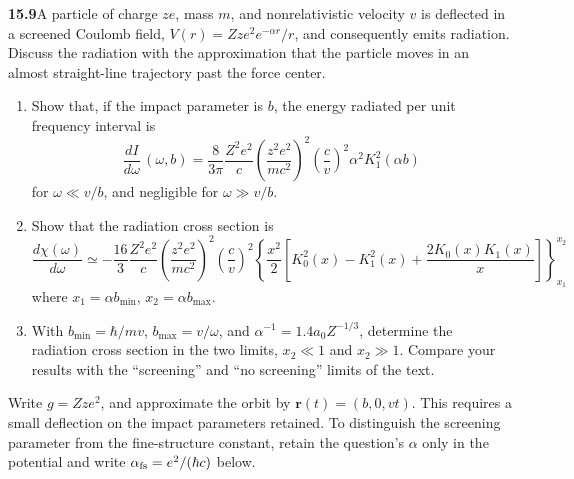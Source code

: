 \par\bigskip
\noindent\textbf{15.9}\quad A particle of charge $ze$, mass $m$, and nonrelativistic velocity $v$ is deflected in a screened Coulomb field, $V(r)=Zze^{2}e^{-\alpha r}/r$, and consequently emits radiation. Discuss the radiation with the approximation that the particle moves in an almost straight-line trajectory past the force center.
\begin{enumerate}
\item[(a)] Show that, if the impact parameter is $b$, the energy radiated per unit frequency interval is
\[
\frac{dI}{d\omega}\,(\omega,b)=\frac{8}{3\pi}\frac{Z^{2}e^{2}}{c}\left(\frac{z^{2}e^{2}}{mc^{2}}\right)^{2}\!\left(\frac{c}{v}\right)^{2}\!\alpha^{2}K_{1}^{2}(\alpha b)
\]
for $\omega\ll v/b$, and negligible for $\omega\gg v/b$.
\item[(b)] Show that the radiation cross section is
\[
\frac{d\chi(\omega)}{d\omega}\simeq-\frac{16}{3}\frac{Z^{2}e^{2}}{c}\left(\frac{z^{2}e^{2}}{mc^{2}}\right)^{2}\!\left(\frac{c}{v}\right)^{2}\!\left\{\frac{x^{2}}{2}\left[K_{0}^{2}(x)-K_{1}^{2}(x)+\frac{2K_{0}(x)K_{1}(x)}{x}\right]\right\}_{x_{1}}^{x_{2}}
\]
where $x_{1}=\alpha b_{\min}$, $x_{2}=\alpha b_{\max}$.
\item[(c)] With $b_{\min}=\hbar/mv$, $b_{\max}=v/\omega$, and $\alpha^{-1}=1.4a_{0}Z^{-1/3}$, determine the radiation cross section in the two limits, $x_{2}\ll1$ and $x_{2}\gg1$. Compare your results with the ``screening'' and ``no screening'' limits of the text.
\end{enumerate}
\solution

Write $g=Zze^2$, and approximate the orbit by
$\mathbf r(t)=(b,0,vt)$.  This requires a small deflection on the
impact parameters retained.  To distinguish the screening parameter
from the fine-structure constant, retain the question's $\alpha$ only
in the potential and write $\alpha_{\rm fs}=e^2/(\hbar c)$ below.

